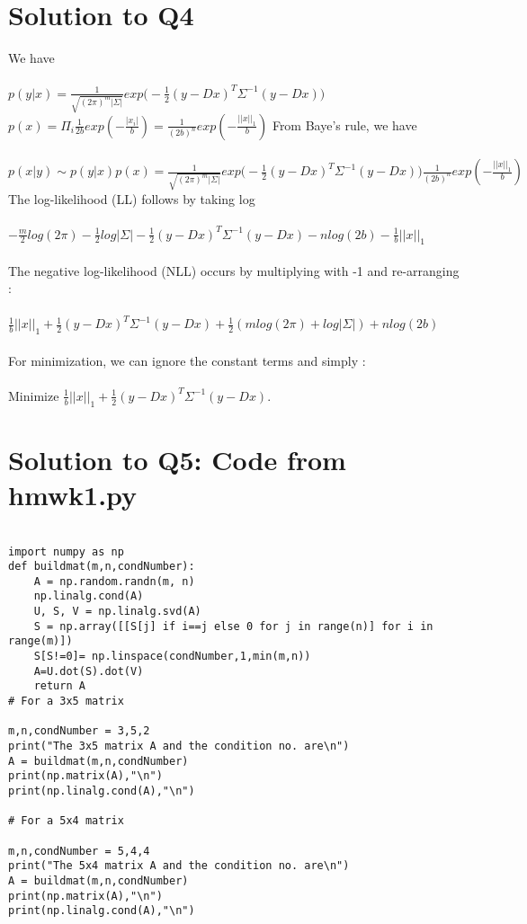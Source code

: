 \documentclass{article}
\begin{document}
\section*{Solution to Q4}
We have \\\\
$p(y|x) = \frac{1}{\sqrt{(2\pi)^m|\Sigma|}} exp\big( -\frac{1}{2}(y-Dx)^T\Sigma^{-1}(y-Dx)\big) $
$p(x) = \Pi_{i} \frac{1}{2b}exp(-\frac{|x_i|}{b}) = \frac{1}{(2b)^n} exp(-\frac{||x||_1}{b}) $
From Baye's rule, we have \\\\ 
$ p(x|y) \sim p(y|x)p(x) = \frac{1}{\sqrt{(2\pi)^m|\Sigma|}} exp \big( -\frac{1}{2}(y-Dx)^T\Sigma^{-1}(y-Dx) \big) \frac{1}{(2b)^n}exp(-\frac{||x||_1}{b}) $ 
The log-likelihood (LL) follows by taking log \\\\
$-\frac{m}{2}log(2\pi) -\frac{1}{2}log|\Sigma| -\frac{1}{2} (y-Dx)^T\Sigma^{-1}(y-Dx) - nlog(2b) -\frac{1}{b}||x||_1 $ \\\\
The negative log-likelihood (NLL) occurs by multiplying with -1 and re-arranging :\\\\
$ \frac{1}{b}||x||_1 + \frac{1}{2}(y-Dx)^T\Sigma^{-1}(y-Dx) + \frac{1}{2}(mlog(2\pi) + log|\Sigma|) + nlog(2b) $ \\\\
For minimization, we can ignore the constant terms and simply : \\\\
Minimize $ \frac{1}{b}||x||_1 + \frac{1}{2}(y-Dx)^T\Sigma^{-1}(y-Dx). $

\newpage %
\section*{Solution to Q5:  Code from hmwk1.py}
\begin{verbatim}

import numpy as np
def buildmat(m,n,condNumber):
    A = np.random.randn(m, n)
    np.linalg.cond(A)
    U, S, V = np.linalg.svd(A)
    S = np.array([[S[j] if i==j else 0 for j in range(n)] for i in range(m)])   
    S[S!=0]= np.linspace(condNumber,1,min(m,n))
    A=U.dot(S).dot(V)
    return A
# For a 3x5 matrix
    
m,n,condNumber = 3,5,2
print("The 3x5 matrix A and the condition no. are\n")
A = buildmat(m,n,condNumber)
print(np.matrix(A),"\n")
print(np.linalg.cond(A),"\n")

# For a 5x4 matrix
    
m,n,condNumber = 5,4,4
print("The 5x4 matrix A and the condition no. are\n")
A = buildmat(m,n,condNumber)
print(np.matrix(A),"\n")
print(np.linalg.cond(A),"\n")

\end{verbatim}
\end{document}
